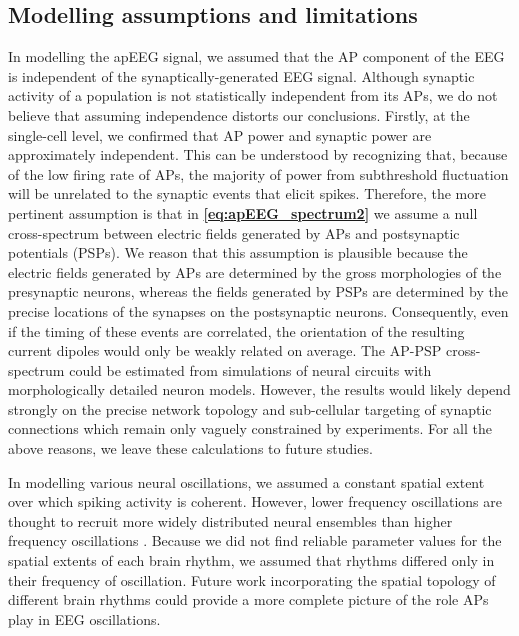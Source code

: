 \subsection{Modelling assumptions and limitations}
In modelling the apEEG signal, we assumed that the AP component of the EEG is independent of the synaptically-generated EEG signal. Although synaptic activity of a population is not statistically independent from its APs, we do not believe that assuming independence distorts our conclusions. Firstly, at the single-cell level, we confirmed that AP power and synaptic power are approximately independent. This can be understood by recognizing that, because of the low firing rate of APs, the majority of power from subthreshold fluctuation will be unrelated to the synaptic events that elicit spikes. Therefore, the more pertinent assumption is that in \textbf{\ref{eq:apEEG_spectrum2}} we assume a null cross-spectrum between electric fields generated by APs and postsynaptic potentials (PSPs). We reason that this assumption is plausible because the electric fields generated by APs are determined by the gross morphologies of the presynaptic neurons, whereas the fields generated by PSPs are determined by the precise locations of the synapses on the postsynaptic neurons\cite{Ahlfors2015,Brake2024}. Consequently, even if the timing of these events are correlated, the orientation of the resulting current dipoles would only be weakly related on average. The AP-PSP cross-spectrum could be estimated from simulations of neural circuits with morphologically detailed neuron models. However, the results would likely depend strongly on the precise network topology and sub-cellular targeting of synaptic connections which remain only vaguely constrained by experiments. For all the above reasons, we leave these calculations to future studies.

In modelling various neural oscillations, we assumed a constant spatial extent over which spiking activity is coherent. However, lower frequency oscillations are thought to recruit more widely distributed neural ensembles than higher frequency oscillations \cite{Buzsaki2006}. Because we did not find reliable parameter values for the spatial extents of each brain rhythm, we assumed that rhythms differed only in their frequency of oscillation. Future work incorporating the spatial topology of different brain rhythms could provide a more complete picture of the role APs play in EEG oscillations.


